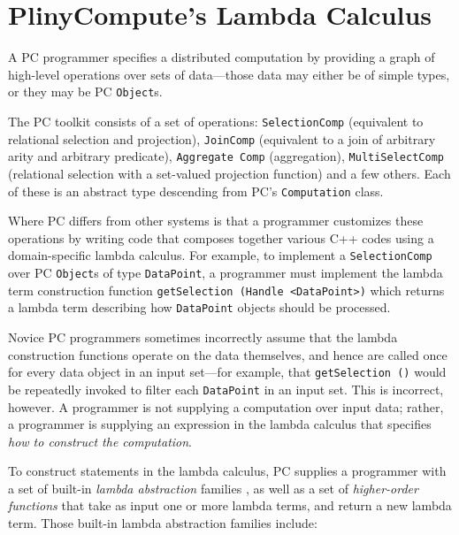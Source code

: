 \section{PlinyCompute's Lambda Calculus}
A PC programmer specifies a distributed computation by providing a graph of high-level operations over sets of data---those data
may either be of simple types, or they may be
PC \texttt{Object}s. 

The PC toolkit consists of a set of
operations: 
\texttt{SelectionComp} (equivalent to relational selection and projection), \texttt{JoinComp} (equivalent to a join of arbitrary arity and arbitrary predicate), 
\texttt{Aggregate Comp} (aggregation), \texttt{MultiSelectComp} (relational selection with a set-valued projection function) and a few others.  
Each of these is an abstract type descending from PC's \texttt{Computation} class.

Where PC differs from other systems is that a programmer customizes these operations by writing code that composes together various C++ codes 
using a 
domain-specific lambda calculus.
For example, to implement a \texttt{SelectionComp} over PC \texttt{Object}s of type \texttt{DataPoint}, a programmer
must implement the lambda term construction function \texttt{getSelection (Handle <DataPoint>)} which returns a lambda term
describing how \texttt{DataPoint} objects
should be processed.

Novice PC programmers sometimes incorrectly assume that the lambda construction functions operate on the data themselves, and
hence are called once for every data object in an input set---for example, 
that
\texttt{getSelection ()} would be repeatedly invoked to filter each \texttt{DataPoint} in an input set.  
This is incorrect, however.
A programmer is not supplying a computation over input data; rather, a programmer is supplying an expression in the lambda calculus that 
specifies \emph{how to construct the computation}.

To construct statements in the lambda calculus, PC supplies a programmer with a set of built-in \emph{lambda abstraction} 
families \cite{miller1991logic}, as 
well as a set of \emph{higher-order functions} \cite{chen1993hilog}
that take as input one or more lambda terms, and return a new lambda term.  Those built-in lambda abstraction families 
include:

